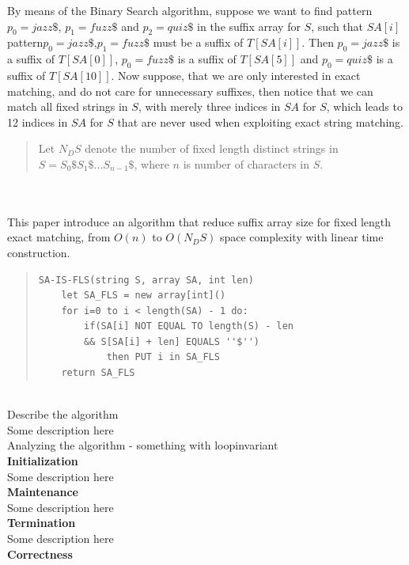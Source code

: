\documentclass[12pt]{article} %
\begin{document}
By means of the Binary Search algorithm, suppose we want to find pattern $p_0=jazz\$$, $ p_1=fuzz\$$ and $p_2=quiz\$$ in the suffix array for $S$, such that $SA[i]$ pattern$ p_0=jazz\$$,$ p_1=fuzz\$$ must be a suffix of $T[SA[i]]$. Then $p_0=jazz\$$ is a suffix of $T[SA[0]]$, $p_0=fuzz\$$ is a suffix of $T[SA[5]]$ and $p_0=quiz\$$ is a suffix of $T[SA[10]]$. Now suppose, that we are only interested in exact matching, and do not care for unnecessary suffixes, then notice that we can match all fixed strings in $S$, with merely three indices in $SA$ for $S$, which leads to 12 indices in $SA$ for $S$ that are never used when exploiting exact string matching. 
\\
\begin{quote}
Let $N_DS$ denote the number of fixed length distinct strings in $S=S_0\$S_1\$...S_{n-1}\$ $, where $n$ is number of characters in $S$.
\end{quote}
\\ \\
This paper introduce an algorithm that reduce suffix array size for fixed length exact matching, from $O(n)$ to $O(N_DS)$ space complexity with linear time construction. 

\begin{quote}
\begin{lstlisting}
SA-IS-FLS(string S, array SA, int len)
	let SA_FLS = new array[int]()
	for i=0 to i < length(SA) - 1 do:
		if(SA[i] NOT EQUAL TO length(S) - len
		&& S[SA[i] + len] EQUALS ''$'') 
			then PUT i in SA_FLS
	return SA_FLS
\end{lstlisting}
\end{quote}
\\
Describe the algorithm
\\
Some description here
\\

Analyzing the algorithm - something with loopinvariant
\\ 
\textbf{Initialization}
\\
Some description here
\\

\textbf{Maintenance}
\\
Some description here
\\

\textbf{Termination}
\\
Some description here
\\

\textbf{Correctness}
\\
\end{document}
